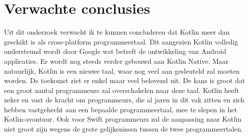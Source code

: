 	\section{Verwachte conclusies}
	\label{sec:verwachte_conclusies}
	Uit dit onderzoek verwacht ik te kunnen concluderen dat Kotlin meer dan geschikt is als cross-platform programmeertaal. Dit aangezien Kotlin volledig ondersteund wordt door Google wat betreft de ontwikkeling van Android applicaties. Er wordt nog steeds verder gebouwd aan Kotlin Native. Maar natuurlijk, Kotlin is een nieuwe taal, waar nog veel aan gesleuteld zal moeten worden. De toekomst ziet er enkel maar veel belovend uit. De kans is groot dat een groot aantal programmeurs zal overschakelen naar deze taal. Kotlin heeft zeker en vast de kracht om programmeurs, die al jaren in dit vak zitten en zich hebben vastgehecht aan een bepaalde programmeertaal, mee te slepen in het Kotlin-avontuur. Ook voor Swift programmeurs zal de aanpassing naar Kotlin niet groot zijn wegens de grote gelijkenissen tussen de twee programmeertalen.
	


